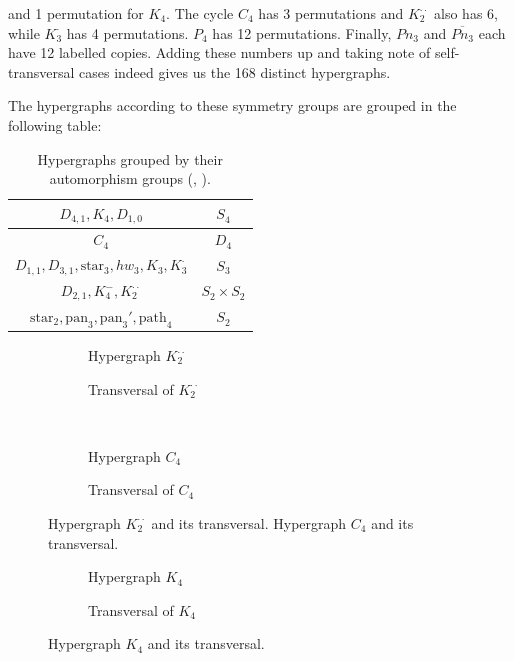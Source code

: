 \noindent and 1 permutation for $K_4$. The cycle $C_4$ has 3 permutations and $K_2^{\cdot\cdot}$ also has 6, while $K_3^{\cdot}$ has 4 permutations. $P_4$ has 12 permutations. Finally, $Pn_3$ and $\overline{Pn_3}$ each have 12 labelled copies. Adding these numbers up and taking note of self-transversal cases indeed gives us the 168 distinct hypergraphs.

The hypergraphs according to these symmetry groups are grouped in the following table:

\begin{table}[h]
\centering
\begin{tabular}{|c|c|}
\hline
$D_{4,1},K_4,D_{1,0}$ & $S_4$\\\hline
$C_4$ & $D_4$\\\hline
$D_{1,1},D_{3,1},\text{star}_3,hw_3,K_3,K_3^{\cdot}$ & $S_3$\\\hline
$D_{2,1},K_4^-,K_2^{\cdot\cdot}$ & $S_2\times S_2$\\\hline
$\text{star}_2,\text{pan}_3,\text{pan}_3',\text{path}_4$ & $S_2$\\\hline
\end{tabular}
\caption{Hypergraphs grouped by their automorphism groups (, ).}
\end{table}

\begin{figure}[tp]
\centering
\begin{subfigure}{0.45\linewidth}\centering\caption{Hypergraph $K_2^{\cdot\cdot}$}\end{subfigure}\hfill
\begin{subfigure}{0.45\linewidth}\centering\caption{Transversal of $K_2^{\cdot\cdot}$}\end{subfigure}\\[8pt]
\begin{subfigure}{0.45\linewidth}\centering\caption{Hypergraph $C_4$}\end{subfigure}\hfill
\begin{subfigure}{0.45\linewidth}\centering\caption{Transversal of $C_4$}\end{subfigure}
\caption{Hypergraph $K_2^{\cdot\cdot}$ and its transversal. Hypergraph $C_4$ and its transversal.}\label{fig:k2dd-c4}
\end{figure}

\begin{figure}[tp]
\centering
\begin{subfigure}{0.45\linewidth}\centering\caption{Hypergraph $K_4$}\end{subfigure}\hfill
\begin{subfigure}{0.45\linewidth}\centering\caption{Transversal of $K_4$}\end{subfigure}
\caption{Hypergraph $K_4$ and its transversal.}\label{fig:k4}
\end{figure}

